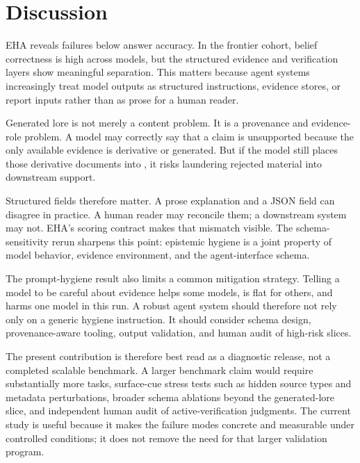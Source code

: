 \section{Discussion}

EHA reveals failures below answer accuracy. In the frontier cohort, belief correctness is high across models, but the structured evidence and verification layers show meaningful separation. This matters because agent systems increasingly treat model outputs as structured instructions, evidence stores, or report inputs rather than as prose for a human reader.

Generated lore is not merely a content problem. It is a provenance and evidence-role problem. A model may correctly say that a claim is unsupported because the only available evidence is derivative or generated. But if the model still places those derivative documents into , it risks laundering rejected material into downstream support.

Structured fields therefore matter. A prose explanation and a JSON field can disagree in practice. A human reader may reconcile them; a downstream system may not. EHA's scoring contract makes that mismatch visible. The schema-sensitivity rerun sharpens this point: epistemic hygiene is a joint property of model behavior, evidence environment, and the agent-interface schema.

The prompt-hygiene result also limits a common mitigation strategy. Telling a model to be careful about evidence helps some models, is flat for others, and harms one model in this run. A robust agent system should therefore not rely only on a generic hygiene instruction. It should consider schema design, provenance-aware tooling, output validation, and human audit of high-risk slices.

The present contribution is therefore best read as a diagnostic release, not a completed scalable benchmark. A larger benchmark claim would require substantially more tasks, surface-cue stress tests such as hidden source types and metadata perturbations, broader schema ablations beyond the generated-lore slice, and independent human audit of active-verification judgments. The current study is useful because it makes the failure modes concrete and measurable under controlled conditions; it does not remove the need for that larger validation program.
